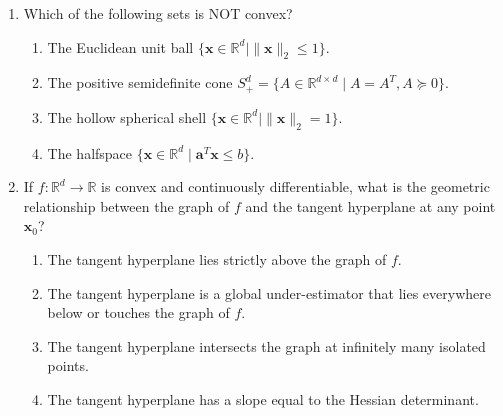 \begin{enumerate}[label=\textbf{MCQ\arabic*.}]
    \item Which of the following sets is NOT convex?
    \begin{enumerate}[label=(\alph*)]
        \item The Euclidean unit ball $\{\mathbf{x} \in \mathbb{R}^d \mid \|\mathbf{x}\|_2 \le 1\}$.
        \item The positive semidefinite cone $S^d_+ = \{A \in \mathbb{R}^{d \times d} \mid A = A^T, A \succeq 0\}$.
        \item The hollow spherical shell $\{\mathbf{x} \in \mathbb{R}^d \mid \|\mathbf{x}\|_2 = 1\}$.
        \item The halfspace $\{\mathbf{x} \in \mathbb{R}^d \mid \mathbf{a}^T \mathbf{x} \le b\}$.
    \end{enumerate}

    \item If $f: \mathbb{R}^d \to \mathbb{R}$ is convex and continuously differentiable, what is the geometric relationship between the graph of $f$ and the tangent hyperplane at any point $\mathbf{x}_0$?
    \begin{enumerate}[label=(\alph*)]
        \item The tangent hyperplane lies strictly above the graph of $f$.
        \item The tangent hyperplane is a global under-estimator that lies everywhere below or touches the graph of $f$.
        \item The tangent hyperplane intersects the graph at infinitely many isolated points.
        \item The tangent hyperplane has a slope equal to the Hessian determinant.
    \end{enumerate}
\end{enumerate}
